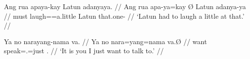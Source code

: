 \pex
\a\begingl
	\gla Ang rua apaya-kay {} Latun adanyaya. //
	\glb Ang rua apa-ya=kay Ø Latun adanya-ya //
	\glc \AgtT{} must laugh=\TsgM{}=a.little \Top{} Latun that.one-\Loc{} //
	\glft `Latun had to laugh a little at that.' //
\endgl

\a\begingl
	\gla Ya no narayang-nama va. //
	\glb Ya no nara=yang=nama va.Ø //
	\glc \LocT{} want speak=\Fsg{}.\Aarg{}=just \Ssg{}.\Top{} //
	\glft `It is you I just want to talk to.' //
\endgl
\xe

